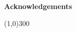 \begin{flushright}
 
   	\thispagestyle{empty}
 
       \textbf{Acknowledgements} 
\end{flushright}
       
\begin{center}
	\line(1,0){300} \\
	[0.25in]
	
	\lipsum[1] 
\end{center}
 
       
       
 
     
